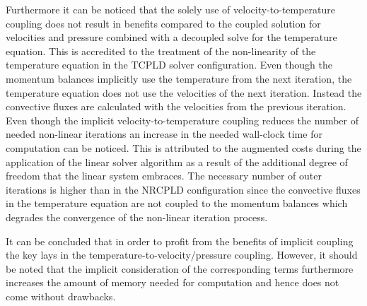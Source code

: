 Furthermore it can be noticed that the solely use of velocity-to-temperature coupling does not result in benefits compared to the coupled solution for velocities and pressure combined with a decoupled solve for the temperature equation. This is accredited to the treatment of the non-linearity of the temperature equation in the TCPLD solver configuration. Even though the momentum balances implicitly use the temperature from the next iteration, the temperature equation does not use the velocities of the next iteration. Instead the convective fluxes are calculated with the velocities from the previous iteration. Even though the implicit velocity-to-temperature coupling reduces the number of needed non-linear iterations an increase in the needed wall-clock time for computation can be noticed. This is attributed to the augmented costs during the application of the linear solver algorithm as a result of the additional degree of freedom that the linear system embraces. The necessary number of outer iterations is higher than in the NRCPLD configuration since the convective fluxes in the temperature equation are not coupled to the momentum balances which degrades the convergence of the non-linear iteration process.

It can be concluded that in order to profit from the benefits of implicit coupling the key lays in the temperature-to-velocity/pressure coupling. However, it should be noted that the implicit consideration of the corresponding terms furthermore increases the amount of memory needed for computation and hence does not come without drawbacks.

